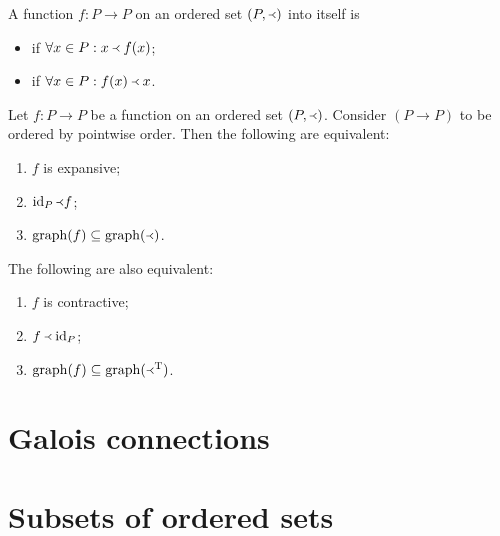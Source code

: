 \begin{definition}
A function $f: P\to P$ on an ordered set $(P,\Yleft)$ into itself is
\begin{itemize}
\item {} if $\forall x\in P: x\Yleft f(x)$;
\item {} if $\forall x\in P: f(x)\Yleft x$.
\end{itemize}
\end{definition}

\begin{lemma}
Let $f:P\to P$ be a function on an ordered set $(P,\Yleft)$. Consider $(P\to P)$ to be ordered by pointwise order. Then the following are equivalent:
\begin{enumerate}
\item $f$ is expansive;
\item $\operatorname{id}_P \Yleft f$;
\item $\operatorname{graph}(f) \subseteq \operatorname{graph}(\Yleft)$.
\end{enumerate}
The following are also equivalent:
\begin{enumerate}
\item $f$ is contractive;
\item $f \Yleft \operatorname{id}_P$;
\item $\operatorname{graph}(f) \subseteq \operatorname{graph}(\Yleft^{\mathrm{T}})$.
\end{enumerate}
\end{lemma}

\section{Galois connections}


\section{Subsets of ordered sets}
